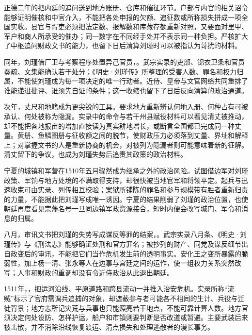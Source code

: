 正德二年的把内廷的追问送到地方账册、仓库和催征环节。户部与内官的相关诏令能够证明催核和中官介入，不能把各处申报的欠额、追征数或所称损失拼成一项全国实收。县官与胥吏必须把法定数、报解数和库藏存额重新对照，又要面对里甲、军户和商人所承受的催办；同一数字在不同经手处并不表示同一种负担。严核扩大了中枢追问财政文书的能力，也留下日后清算刘瑾时可以被指认为苛扰的材料。

同年，刘瑾借厂卫与考察程序处置异己官员，。武宗实录的吏部、锦衣卫条和官员奏疏、文集能确认若干处分；《明史·刘瑾传》所整理的受害人数、罪名和权力归属，不能使刘瑾成为每一项决定的唯一行动者。近侍、皇帝与文官网络共同重排了谁能递进批评、谁须先自证的条件；这一收缩也留下了日后反向清算的政治通道。

次年，丈尺和地籍成为更尖锐的工具。要求地方重新辨认何地入册、何种占有可被承认、何处被称为隐漏。实录中的命令与若干州县赋役材料可以看见清丈被推动，却不能把各地报亩的增加直接读为真实耕地增长，或断言全国都已完成同一种丈量。黄册、鱼鳞图册与征收额之间的脱节，使财政压力必须落到丈量、界址和解释上；对掌握文书的人是重新协商的机会，对被列为隐漏者则可能意味着新的征解。清丈留下的争议，也成为刘瑾失势后追责其政策的政治材料。

宁夏的城镇和军营在1510年五月骤然成为继承之外的政治风险。试图借边军对刘瑾政策、军饷与地方处境的不满取得支持，却很快被当地官军和将领平定。起兵与迅速收束可由实录、列传相互校验；案狱所铺陈的罪名和参与规模带有胜者重新归责的力量，不能据此把刘瑾写成唯一诱因。宁夏的结果削弱了刘瑾的政治位置，也使朝廷再度看见宗藩名号一旦同边镇军政资源接合，短时内便会改写城门、军令和消息的归属。

八月，审讯文书把刘瑾的失势写成谋反等罪的结案，。武宗实录八月条、《明史·刘瑾传》与《刑法志》能够确证处刑和官方罪名；被抄列的财产、同党及谋反细节出自政变后的审讯，不能把它们当作危机发生前的透明事实。安化王之变所暴露的脆弱性，加上杨一清、张永等人在边事与宫廷之间的运作，使一组权力关系突然改写；人事和财政的重调却没有令近侍政治从此退出朝廷。

1511年，，把运河沿线、平原道路和跨县流动一并推入治安危机。实录所称“流贼”标示了官府需调兵追捕的对象，却遮蔽参与者可能各不相同的生计、兵役与迁徙背景；地方志所记灾荒与兵事也只能照亮若干地点，不能可靠计算人数。地方官须决定何处设防、怎样护运，船户和市镇则要判断是否改道或暂避。主要武装后来被击散，并不消除沿线恢复渡运、清点损失和处理逃散者的漫长事务。

